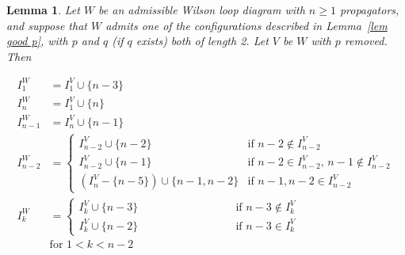 \documentclass[11pt]{article}
\newtheorem{lem}[thm]{Lemma}
\theoremstyle{remark}
\theoremstyle{definition}
\begin{document}
\begin{lem}\label{lem I}
Let $W$ be an admissible Wilson loop diagram with $n\geq 1$ propagators, and suppose that $W$ admits one of the configurations described in Lemma~\ref{lem good p}, with $p$ and $q$ (if $q$ exists) both of length 2. Let $V$ be $W$ with $p$ removed.  Then

  \begin{align*}
    I_1^{W} & = I_1^{V} \cup \{n-3\} \\
    I_n^{W} & = I_1^{V} \cup \{n\} \\
    I_{n-1}^{W} & = I_n^{V} \cup \{n-1\} \\
    I_{n-2}^{W} & =
    \begin{cases}
      I_{n-2}^{V}\cup \{n-2\} & \text{if $n-2\not\in I_{n-2}^{V}$} \\
      I_{n-2}^{V}\cup \{n-1\} & \text{if $n-2\in I_{n-2}^{V}$, $n-1\not\in I_{n-2}^{V}$} \\
      (I_{n}^{V} - \{n-5\})\cup \{n-1,n-2\} & \text{if $n-1, n-2\in I_{n-2}^{V}$}
    \end{cases} \\
    I_{k}^{W} & =
    \begin{cases}
      I_k^{V}\cup \{n-3\} & \qquad \qquad \qquad \qquad \text{if $n-3 \not\in I_k^{V}$}\\
      I_k^{V}\cup\{n-2\} & \qquad \qquad \qquad \qquad \text{if $n-3\in I_k^{V}$}
    \end{cases} \\
    & \text{for $1<k<n-2$}
  \end{align*}
\end{lem}
\end{document}
